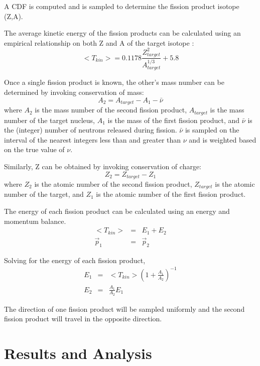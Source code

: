 \documentclass{anstrans}
\begin{document}
A CDF is computed and is sampled to determine the fission product isotope (Z,A).

The average kinetic energy of the fission products can be calculated using an empirical relationship
on both Z and A of the target isotope \cite{geant}:
\begin{equation}
  <T_{kin}> = 0.1178 \frac{Z_{target}^2}{A_{target}^{1/3}} + 5.8
\end{equation}

Once a single fission product is known, the other's mass number can be determined by invoking conservation of mass:
\begin{equation}
  A_{2} = A_{target} - A_{1} - \bar \nu
\end{equation}
where $A_{2}$ is the mass number of the second fission product, $A_{target}$ is the mass number of the target nucleus, $A_{1}$ is the mass of the first fission product, and
$\bar \nu$ is the (integer) number of neutrons released during fission. $\bar \nu$ is sampled on the interval of the nearest integers less than and greater than $\nu$ and is weighted based on the true value of $\nu$.

Similarly, Z can be obtained by invoking conservation of charge:
\begin{equation}
  Z_{2} = Z_{target} - Z_{1}
\end{equation}
where $Z_{2}$ is the atomic number of the second fission product, $Z_{target}$ is the atomic number of the target, and $Z_{1}$ is the atomic number of the first fission product.

The energy of each fission product can be calculated using an energy and momentum balance.
\begin{eqnarray}
  <T_{kin}> &=& E_{1} + E_{2} \\
  \vec p_{1} &=& \vec p_{2}
\end{eqnarray}

Solving for the energy of each fission product,
\begin{eqnarray}
  E_{1} &=& <T_{kin}>\left(1 +  \frac{A_{1}}{A_{2}}\right)^{-1}\\
  E_{2} &=& \frac{A_{1}}{A_{2}}E_{1}
\end{eqnarray}

The direction of one fission product will be sampled uniformly and the second
fission product will travel in the opposite direction.

\section{Results and Analysis}
\end{document}
